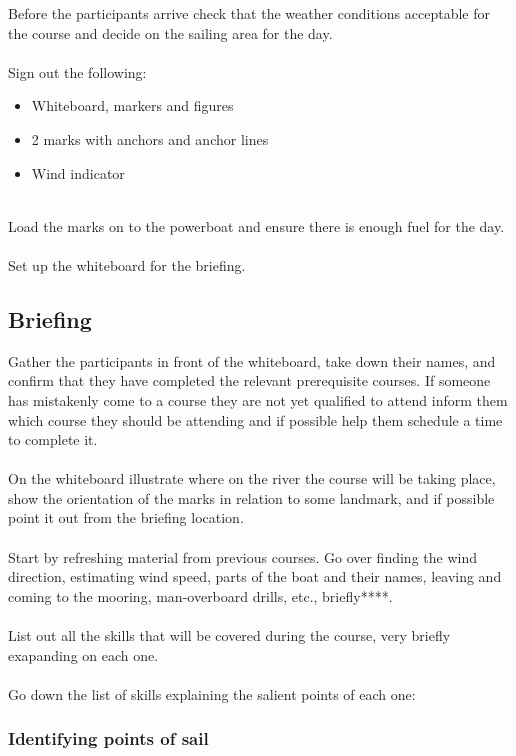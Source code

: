 \documentclass[12pt]{scrartcl}
\begin{document}
Before the participants arrive check that the weather conditions acceptable for the course and decide on the sailing area for the day.
\\
\\
Sign out the following:

\label{list:materials}
\begin{itemize}
	\item Whiteboard, markers and figures
	\item 2 marks with anchors and anchor lines
	\item Wind indicator
\end{itemize}
\\
Load the marks on to the powerboat and ensure there is enough fuel for the day.
\\
\\
Set up the whiteboard for the briefing.

\subsection{Briefing} \label{subsec:briefing}

Gather the participants in front of the whiteboard, take down their names, and confirm that they have completed the relevant prerequisite courses. If someone has mistakenly come to a course they are not yet qualified to attend inform them which course they should be attending and if possible help them schedule a time to complete it.
\\
\\
On the whiteboard illustrate where on the river the course will be taking place, show the orientation of the marks in relation to some landmark, and if possible point it out from the briefing location.
\\
\\
Start by refreshing material from previous courses. Go over finding the wind direction, estimating wind speed, parts of the boat and their names, leaving and coming to the mooring, man-overboard drills, etc., briefly****.
\\
\\
List out all the skills that will be covered during the course, very briefly exapanding on each one.
\\
\\
Go down the list of skills explaining the salient points of each one:

\subsubsection{Identifying points of sail} \label{subsubsec:points-of-sail}
\end{document}
